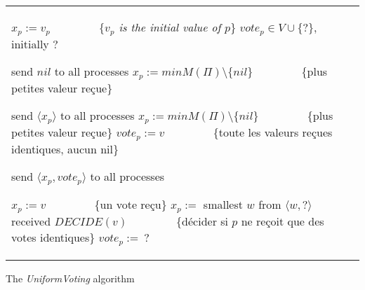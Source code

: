 \documentclass{article}
\begin{document}
\begin{algorithm}[htb]
\scriptsize{
\begin{distribalgo}[1]
\begin{tabular}{ll}
\begin{minipage}{33em}


\INDENT{\textbf{Initialization:}}
  \STATE $x_p := v_p$ ~~~~~~~~\{\emph{$v_p$ is the initial value of $p$}\}
  \STATE $vote_p \in V\cup\{ ? \}$, initially $?$

\ENDINDENT
\BLANK

\INDENT{\textbf{Round $r=0$:}}
 \INDENT{$S_p^r:$}
    \STATE send $nil$ to all processes
  \ENDINDENT
  \BLANK
  \INDENT{$T_p^r:$}
	\STATE $ x_p := min M(\Pi) \setminus \{nil\}$ ~~~~~~~~\{plus petites valeur reçue\}
  \ENDINDENT
\ENDINDENT

\INDENT{\textbf{Round $r=2\phi+2$:}}
 \INDENT{$S_p^r:$}
    \STATE send $\langle x_p \rangle$ to all processes
  \ENDINDENT
  \BLANK
  \INDENT{$T_p^r:$}
	\STATE $ x_p := min M(\Pi) \setminus \{nil\}$ ~~~~~~~~\{plus petites valeur reçue\}
	\IF{$M(\Pi) = \{v\}$}
      \STATE $vote_p := v$ ~~~~~~~~\{toute les valeurs reçues identiques, aucun nil\}
    \ENDIF
  \ENDINDENT
\ENDINDENT

\INDENT{\textbf{Round $r=2\phi+1$:}}
  \INDENT{$S_p^r:$}
    \STATE send $\langle x_p , vote_p \rangle$ to all processes
  \ENDINDENT
  \BLANK
 \INDENT{$T_p^r:$}

	  \IF{$M(q) = \langle v, v \rangle$}
		  \STATE $x_p:= v$ ~~~~~~~~\{un vote reçu\}
     \ELSE
       \STATE $x_p :=$ smallest  $w$ from  $\langle w , ? \rangle$ received
       \ENDIF
	   \IF{$M(\Pi) = \langle v, v \rangle$}
		  \STATE $DECIDE(v)$ ~~~~~~~~\{décider si $p$ ne reçoit que des votes identiques\}
	  \ENDIF
         \STATE $vote_p :=\ ?$
  \ENDINDENT
\ENDINDENT

\end{minipage}
\end{tabular}

\caption{The {\em UniformVoting} algorithm}
\label{unifvotfig}
\end{distribalgo}
}
\end{algorithm}
\end{document}
